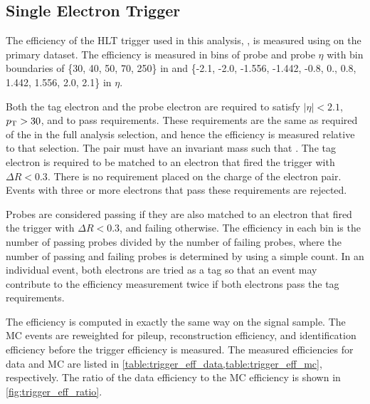 \subsection{Single Electron Trigger}
\label{ssec:sf_trigger}

The efficiency of the HLT trigger used in this analysis,
\SingleElectronTrigger, is measured using \TnP on the primary dataset. The
efficiency is measured in bins of probe \pt and probe $\eta$ with bin
boundaries of \{30, 40, 50, 70, 250\} in \pt and \{-2.1, -2.0, -1.556, -1.442,
-0.8, 0., 0.8, 1.442, 1.556, 2.0, 2.1\} in $\eta$.

Both the tag electron and the probe electron are required to satisfy $|\eta| <
2.1$, $p_{\mathrm{T}} > 30$, and to pass \EGTIGHT requirements. These requirements are the
same as required of the \CentralElectron in the full analysis selection, and
hence the efficiency is measured relative to that selection. The pair must have
an invariant mass such that \MassRange. The tag electron is required to be
matched to an electron that fired the trigger with $\Delta R < 0.3$. There is
no requirement placed on the charge of the electron pair. Events with three or
more electrons that pass these requirements are rejected.

Probes are considered passing if they are also matched to an electron that
fired the trigger with $\Delta R < 0.3$, and failing otherwise. The efficiency
in each bin is the number of passing probes divided by the number of failing
probes, where the number of passing and failing probes is determined by using a
simple count. In an individual event, both electrons are tried as a tag so that
an event may contribute to the efficiency measurement twice if both electrons
pass the tag requirements.

The efficiency is computed in exactly the same way on the \MADGRAPH signal
sample. The MC events are reweighted for pileup, reconstruction efficiency, and
identification efficiency before the trigger efficiency is measured. The
measured efficiencies for data and MC are listed in
\cref{table:trigger_eff_data,table:trigger_eff_mc}, respectively. The ratio of
the data efficiency to the MC efficiency is shown in
\cref{fig:trigger_eff_ratio}.







